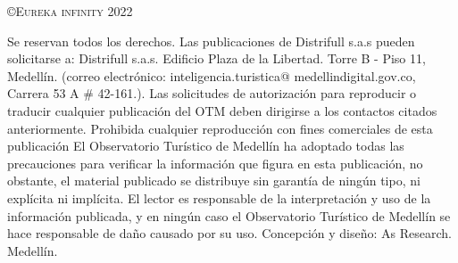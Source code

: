 \thispagestyle{empty}
\vspace*{0.5cm}
\begin{flushleft}
	{\Large\scshape \copyright Eureka infinity 2022\\[5pt] }
\end{flushleft}

\vspace*{1cm}
\begin{flushleft}
\end{flushleft}

\vspace*{1cm}
\begin{flushleft}
	{\Large\scshape }
\end{flushleft}

\vspace*{2cm}
\begin{flushleft}
	{\large\scshape     }
\end{flushleft}

\vspace*{2cm}
\begin{flushleft}
	{Se reservan todos los derechos. Las publicaciones de Distrifull s.a.s }
	{pueden solicitarse a:}
	{Distrifull s.a.s. Edificio Plaza de la}
	{Libertad. Torre B - Piso 11, }
	{Medell\'in. (correo electr\'onico:} 
	{inteligencia.turistica@ medellindigital.gov.co, Carrera 53 A $\#$ 42-161.).} 
	{Las solicitudes de autorizaci\'on para reproducir o traducir cualquier publicaci\'on}
	{del OTM deben dirigirse a los contactos citados anteriormente. Prohibida} 
	{cualquier reproducci\'on con fines comerciales de esta publicaci\'on}
	{El Observatorio Tur\'istico de Medell\'in ha adoptado todas las} 
	{precauciones para verificar }
	{la informaci\'on que figura en esta publicaci\'on, no obstante, el}
	{material publicado se distribuye sin garant\'ia de ning\'un tipo, ni} {expl\'icita ni impl\'icita. El lector es responsable de la }
	{interpretaci\'on y uso de la informaci\'on publicada, y en ning\'un caso {el Observatorio Tur\'istico de Medell\'in se hace responsable de} da\~no} 
	{causado por su uso.}
	{Concepci\'on y dise\~no: As Research. Medell\'in.}
\end{flushleft}







